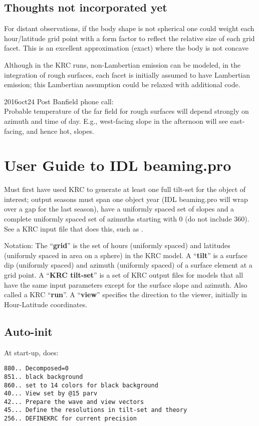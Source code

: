 \documentclass{article}
\begin{document}
\subsection{Thoughts not incorporated yet}

For distant observations, if the body shape is not spherical one could weight
each hour/latitude grid point with a form factor to reflect the relative size of
each grid facet. This is an excellent approximation (exact) where the body is
not concave

Although in the KRC runs, non-Lambertian emission can be modeled, in the
integration of rough surfaces, each facet is initially assumed to have
Lambertian emission; this Lambertian assumption could be relaxed with additional
code.
 
2016oct24 Post Banfield phone call: 
\\ Probable temperature of the far field for rough surfaces will depend strongly
on azimuth and time of day. E.g., west-facing slope in the afternoon will see
east-facing, and hence hot, slopes.
 
\section{User Guide to IDL beaming.pro}
Must first have used KRC to generate at least one full tilt-set for the object
of interest; output seasons must span one object year (IDL beaming.pro will wrap
over a gap for the last season), have a uniformly spaced set of slopes and a
complete uniformly spaced set of azimuths starting with 0 (do not include
360). See a KRC input file that does this, such as  .

Notation:
\qi The ``\textbf{grid}''  is the set of hours (uniformly spaced) and latitudes (uniformly spaced in area on a sphere) in the KRC model.
\qi A ``\textbf{tilt}'' is a surface dip (uniformly spaced) and azimuth (uniformly spaced) of a surface element at a grid point.
\qi A ``\textbf{KRC tilt-set}'' is a set of KRC output files for models that all have the same input parameters except for the surface slope and azimuth. Also called a KRC  ``\textbf{run}''.
\qi A ``\textbf{view}'' specifies the direction to the viewer, initially in Hour-Latitude coordinates.

\subsection{Auto-init}
At start-up,  does:
\vspace{-3.mm} 
\begin{verbatim}
880.. Decomposed=0
851.. black background
860.. set to 14 colors for black background
40... View set by @15 parv
42... Prepare the wave and view vectors
45... Define the resolutions in tilt-set and theory 
256.. DEFINEKRC for current precision
\end{verbatim} 
\end{document}
